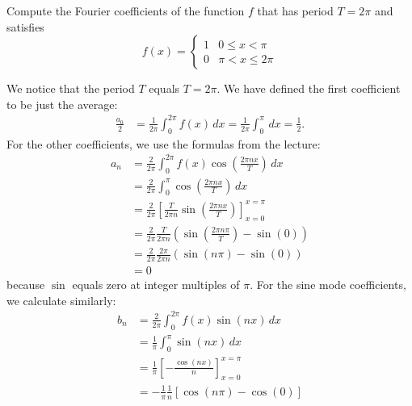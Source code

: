 \documentclass[11pt]{article}
\begin{document}
\begin{exercise}
    Compute the Fourier coefficients of the function $f$ that has period $T = 2\pi$ and satisfies
    \[
        f(x) = \left\{\begin{array}{ll} 1 & 0 \leq x < \pi \\ 0 & \pi < x \leq 2\pi \end{array}\right.
    \]
\end{exercise}
\begin{solution}     
    We notice that the period $T$ equals $T = 2\pi$. 
    We have defined the first coefficient to be just the average:
    \begin{align*}
        \frac{a_0 }{2}
        &= 
        \frac{1}{2\pi} \int_0^{2\pi} f(x) \, dx 
        = 
        \frac{1}{2\pi} \int_0^\pi \, dx  = \frac 1 2
        .
    \end{align*}
    For the other coefficients, we use the formulas from the lecture:
    \begin{align*}
        a_n 
        &= 
        \frac{2}{2\pi} \int_0^{2\pi} f(x) \cos\left(\frac{2\pi n x}{T}\right) \, dx 
        \\&= 
        \frac{2}{2\pi} \int_0^\pi \cos\left(\frac{2\pi n x}{T}\right) \, dx 
        \\
        &= 
        \frac{2}{2\pi} \left[ \frac{T}{2\pi n} \sin\left(\frac{2\pi n x}{T}\right) \right]_{x=0}^{x=\pi}
        \\&= 
        \frac{2}{2\pi} \frac{T}{2\pi n} \left( \sin\left(\frac{2\pi n \pi}{T}\right) - \sin(0) \right) 
        \\&= 
        \frac{2}{2\pi} \frac{2\pi}{2\pi n} \left( \sin\left(n \pi \right) - \sin(0) \right) 
        \\&= 
        0
    \end{align*}
    because $\sin$ equals zero at integer multiples of $\pi$.
    For the sine mode coefficients, we calculate similarly:
    \begin{align*}
        b_n 
        &= 
        \frac{2}{2\pi}
        \int_0^{2\pi} f(x) \sin(nx) \, dx 
        \\
        &= 
        \frac{1}{\pi}
        \int_0^\pi \sin(nx) \, dx 
        \\
        &= 
        \frac{1}{\pi}
        \left[-\frac{\cos(nx)}{n} \right]_{x=0}^{x=\pi} 
        \\
        &= 
        -
        \frac{1}{\pi}
        \frac{1}{n} \left[ \cos(n\pi) - \cos(0) \right] 
        \\

\end{align*}
\end{solution}
\end{document}
